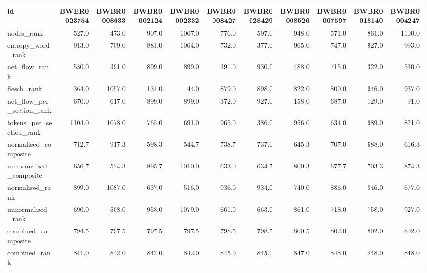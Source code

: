 \begin{tabular}{lrrrrrrrrrr}
\toprule
id & BWBR0023754 & BWBR0008633 & BWBR0002124 & BWBR0002332 & BWBR0008427 & BWBR0028429 & BWBR0008526 & BWBR0007597 & BWBR0018140 & BWBR0004247 \\
\midrule
nodes\_rank & 527.0 & 473.0 & 907.0 & 1067.0 & 776.0 & 597.0 & 948.0 & 571.0 & 861.0 & 1100.0 \\
\cline{1-11}
entropy\_word\_rank & 913.0 & 709.0 & 881.0 & 1064.0 & 732.0 & 377.0 & 965.0 & 747.0 & 927.0 & 993.0 \\
\cline{1-11}
net\_flow\_rank & 530.0 & 391.0 & 899.0 & 899.0 & 391.0 & 930.0 & 488.0 & 715.0 & 322.0 & 530.0 \\
\cline{1-11}
flesch\_rank & 364.0 & 1057.0 & 131.0 & 44.0 & 879.0 & 898.0 & 822.0 & 800.0 & 946.0 & 937.0 \\
\cline{1-11}
net\_flow\_per\_section\_rank & 670.0 & 617.0 & 899.0 & 899.0 & 372.0 & 927.0 & 158.0 & 687.0 & 129.0 & 91.0 \\
\cline{1-11}
tokens\_per\_section\_rank & 1104.0 & 1078.0 & 765.0 & 691.0 & 965.0 & 386.0 & 956.0 & 634.0 & 989.0 & 821.0 \\
\cline{1-11}
normalised\_composite & 712.7 & 917.3 & 598.3 & 544.7 & 738.7 & 737.0 & 645.3 & 707.0 & 688.0 & 616.3 \\
\cline{1-11}
unnormalised\_composite & 656.7 & 524.3 & 895.7 & 1010.0 & 633.0 & 634.7 & 800.3 & 677.7 & 703.3 & 874.3 \\
\cline{1-11}
normalised\_rank & 899.0 & 1087.0 & 637.0 & 516.0 & 936.0 & 934.0 & 740.0 & 886.0 & 846.0 & 677.0 \\
\cline{1-11}
unnormalised\_rank & 690.0 & 508.0 & 958.0 & 1079.0 & 661.0 & 663.0 & 861.0 & 718.0 & 758.0 & 927.0 \\
\cline{1-11}
combined\_composite & 794.5 & 797.5 & 797.5 & 797.5 & 798.5 & 798.5 & 800.5 & 802.0 & 802.0 & 802.0 \\
\cline{1-11}
combined\_rank & 841.0 & 842.0 & 842.0 & 842.0 & 845.0 & 845.0 & 847.0 & 848.0 & 848.0 & 848.0 \\
\cline{1-11}
\bottomrule
\end{tabular}
